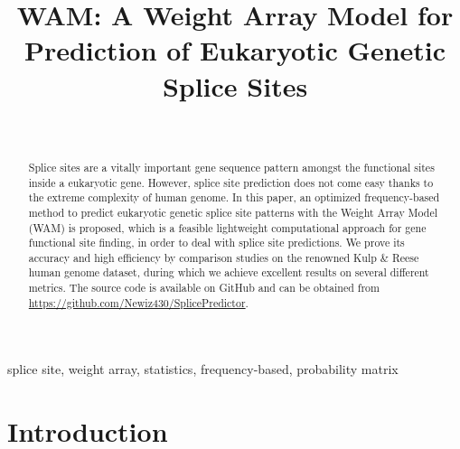 \documentclass[journal,twoside]{IEEEtran}
\begin{document}
\title{WAM: A Weight Array Model for Prediction of Eukaryotic Genetic Splice Sites\\
}

\author{ \\
}

\maketitle

\begin{abstract}
Splice sites are a vitally important gene sequence pattern amongst the functional sites inside a eukaryotic gene. However, splice site prediction does not come easy thanks to the extreme complexity of human genome. In this paper, an optimized frequency-based method to predict eukaryotic genetic splice site patterns with the Weight Array Model (WAM) is proposed, which is a feasible lightweight computational approach for gene functional site finding, in order to deal with splice site predictions. We prove its accuracy and high efficiency by comparison studies on the renowned Kulp \& Reese human genome dataset, during which we achieve excellent results on several different metrics. The source code is available on GitHub and can be obtained from \url{https://github.com/Newiz430/SplicePredictor}. 
\end{abstract}

\begin{IEEEkeywords}
splice site, weight array, statistics, frequency-based, probability matrix
\end{IEEEkeywords}

\section{Introduction}\label{1}
\end{document}
